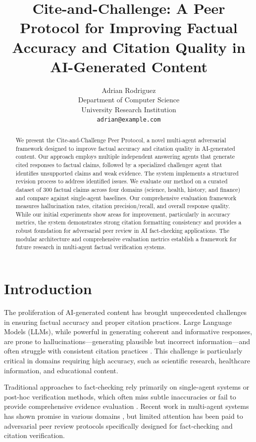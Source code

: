 \documentclass{article}
\title{Cite-and-Challenge: A Peer Protocol for Improving Factual Accuracy and Citation Quality in AI-Generated Content}
\author{%
  Adrian Rodriguez \\
  Department of Computer Science \\
  University Research Institution \\
  \texttt{adrian@example.com} \\
}
\begin{document}
\maketitle

\begin{abstract}
We present the Cite-and-Challenge Peer Protocol, a novel multi-agent adversarial framework designed to improve factual accuracy and citation quality in AI-generated content. Our approach employs multiple independent answering agents that generate cited responses to factual claims, followed by a specialized challenger agent that identifies unsupported claims and weak evidence. The system implements a structured revision process to address identified issues. We evaluate our method on a curated dataset of 300 factual claims across four domains (science, health, history, and finance) and compare against single-agent baselines. Our comprehensive evaluation framework measures hallucination rates, citation precision/recall, and overall response quality. While our initial experiments show areas for improvement, particularly in accuracy metrics, the system demonstrates strong citation formatting consistency and provides a robust foundation for adversarial peer review in AI fact-checking applications. The modular architecture and comprehensive evaluation metrics establish a framework for future research in multi-agent factual verification systems.
\end{abstract}

\section{Introduction}

The proliferation of AI-generated content has brought unprecedented challenges in ensuring factual accuracy and proper citation practices. Large Language Models (LLMs), while powerful in generating coherent and informative responses, are prone to hallucinations—generating plausible but incorrect information—and often struggle with consistent citation practices \cite{zhang2023large, ji2023survey}. This challenge is particularly critical in domains requiring high accuracy, such as scientific research, healthcare information, and educational content.

Traditional approaches to fact-checking rely primarily on single-agent systems or post-hoc verification methods, which often miss subtle inaccuracies or fail to provide comprehensive evidence evaluation \cite{thorne2018fever, augenstein2019multifc}. Recent work in multi-agent systems has shown promise in various domains \cite{wang2024survey, li2023camel}, but limited attention has been paid to adversarial peer review protocols specifically designed for fact-checking and citation verification.
\end{document}

